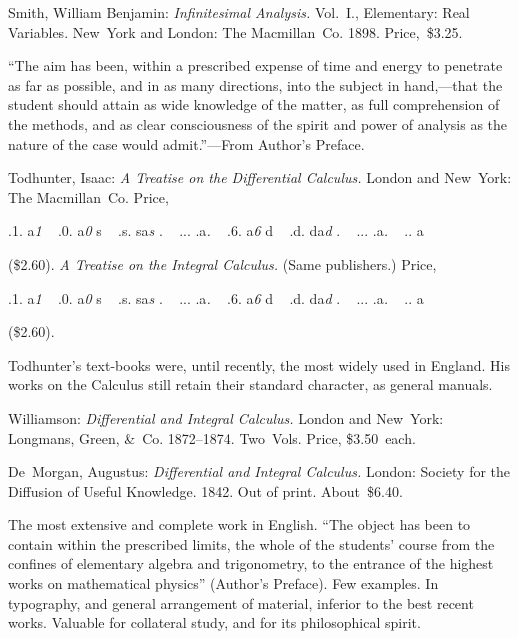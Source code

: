 \documentclass[12pt]{book}[2005/09/16]
\makeatletter
\newcommand{\Chg}[2]{#2}
\newlength{\ParIndent}
\newenvironment{Book}{\medskip\par\noindent\hangindent\ParIndent\ignorespaces}{\par}
\newenvironment{Descrip}{%
  \begin{list}{}{%
      \setlength{\leftmargin}{1.5\ParIndent}%
      \setlength{\itemindent}{\ParIndent}%
      \setlength{\listparindent}{\ParIndent}%
      \setlength{\topsep}{4pt}%
      \item\small\ignorespaces%
  }%
}{%
\end{list}}
\newcommand{\Pagelabel}[1]{\phantomsection\label{page:#1}}
\newcommand{\PageSep}[1]{\Pagelabel{#1}\ignorespaces}
\renewcommand{\(}{{\upshape(}}
\renewcommand{\)}{{\upshape)}}
\newcommand{\Title}[1]{\textit{#1}}
\newif\ifins@rtsp@ce
\def\Price#1{{\ins@rtsp@cefalse\Pr@ce #1\null}}
\def\Pr@ce#1{%
  \ifx#1\null\let\next\empty
  \else\let\next\Pr@ce
  \ifins@rtsp@ce~\ins@rtsp@cefalse\fi
  \if.#1.\ins@rtsp@cetrue
  \else\ifcat#1a\textit{#1}%
  \else{#1}%
  \fi\fi\fi\next}
\makeatother
\begin{document}
\begin{Book}
Smith, William Benjamin: \Title{Infinitesimal Analysis.} Vol.~I., Elementary:
Real Variables. New~York and London: The Macmillan~Co.
1898. Price,~\$3.25.

\begin{Descrip}
``The aim has been, within a prescribed expense of time and
energy to penetrate as far as possible, and in as many directions, into
the subject in hand,---that the student should attain as wide knowledge
of the matter, as full comprehension of the methods, and as clear
consciousness of the spirit and power of analysis as the nature of the
case would admit.''---From Author's Preface.
\end{Descrip}
\end{Book}

\begin{Book}
Todhunter, Isaac: \Title{A Treatise on the Differential Calculus.} London
and New~York: The Macmillan~Co. Price, \Price{10s. 6d.}
(\$2.60). \Title{A Treatise on the Integral Calculus.} (Same publishers.)
Price, \Price{10s. 6d.} (\$2\Chg{ }{.}60).

\begin{Descrip}
Todhunter's text-books were, until recently, the most widely used
in England. His works on the Calculus still retain their standard
character, as general manuals.
\end{Descrip}
\end{Book}
\PageSep{137}

\begin{Book}
Williamson: \Title{Differential and Integral Calculus.} London and
New~York: Longmans, Green, \&~Co. 1872--1874. Two~Vols.
Price, \$3.50~each.
\end{Book}

\begin{Book}
De~Morgan, Augustus: \Title{Differential and Integral Calculus.} London:
Society for the Diffusion of Useful Knowledge. 1842.
Out of print. About~\$6.40.

\begin{Descrip}
The most extensive and complete work in English. ``The object
has been to contain within the prescribed limits, the whole of the
students' course from the confines of elementary algebra and trigonometry,
to the entrance of the highest works on mathematical physics''
(Author's Preface). Few examples. In typography, and general
arrangement of material, inferior to the best recent works. Valuable
for collateral study, and for its philosophical spirit.
\end{Descrip}
\end{Book}
\end{document}
